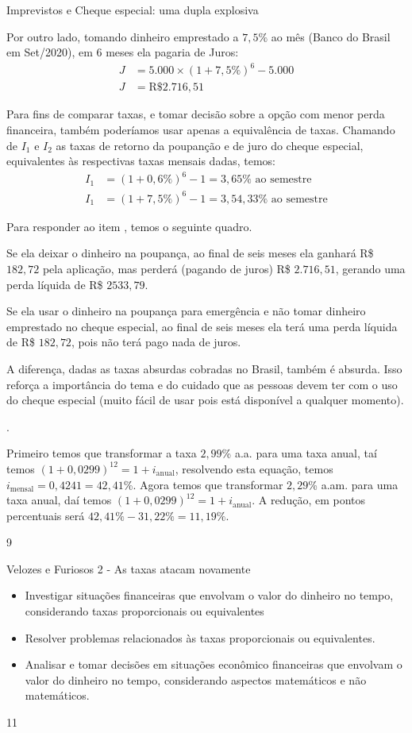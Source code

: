 \begin{answer}{Imprevistos e Cheque especial: uma dupla explosiva}
{\begin{enumerate}
Por outro lado, tomando dinheiro emprestado a $7{,}5\%$ ao mês (Banco do Brasil em Set/2020), em 6 meses ela pagaria de Juros:
\begin{align*}
J&=5.000\times(1+7{,}5\%)^6-5.000\\
J&=\text{R\$ }2.716{,}51
\end{align*}

Para fins de comparar taxas, e tomar decisão sobre a opção com menor perda financeira, também poderíamos usar apenas a equivalência de taxas. Chamando de $I_1$ e $I_2$ as taxas de retorno da poupanção e de juro do cheque especial, equivalentes às respectivas taxas mensais dadas, temos:
\begin{align*}
I_1&=(1+0{,}6\%)^6-1=3{,}65\%\text{ ao semestre}\\
I_1&=(1+7{,}5\%)^6-1=3{,}54{,}33\%\text{ ao semestre}
\end{align*}

Para responder ao item , temos o seguinte quadro.

Se ela deixar o dinheiro na poupança, ao final de seis meses ela ganhará R\$ $182{,}72$ pela aplicação, mas perderá (pagando de juros) R\$ $2.716{,}51$, gerando uma perda líquida de R\$ $2533{,}79$.

Se ela usar o dinheiro na poupança para emergência e não tomar dinheiro emprestado no cheque especial, ao final de seis meses ela terá uma perda líquida de R\$ $182{,}72$, pois não terá pago nada de juros.

A diferença, dadas as taxas absurdas cobradas no Brasil, também é absurda. Isso reforça a importância do tema e do cuidado que as pessoas devem ter com o uso do cheque especial (muito fácil de usar pois está disponível a qualquer momento).
\end{enumerate}.


Primeiro temos que transformar a taxa $2{,}99$\% a.a. para uma taxa anual, taí temos $(1+0{,}0299)^{12}=1+i_{\text{anual}}$, resolvendo esta equação, temos $i_{\text{mensal}}=0{,}4241=42{,}41$\%. Agora temos que transformar $2{,}29$\% a.am. para uma taxa anual, daí temos $(1+0{,}0299)^{12}=1+i_{\text{anual}}$. A redução, em pontos percentuais será $42{,}41\%-31{,}22\%=11{,}19\%$. 

}{9}
\end{answer}
\begin{objectives}{Velozes e Furiosos 2 - As taxas atacam novamente}
{
\begin{itemize}
\item Investigar situações financeiras que envolvam o valor do dinheiro no tempo, considerando taxas proporcionais ou equivalentes
\item Resolver problemas relacionados às taxas proporcionais ou equivalentes.
\item Analisar e tomar decisões em situações econômico financeiras que envolvam o valor do dinheiro no tempo, considerando aspectos matemáticos e não matemáticos.
\end{itemize}
}{1}{1}
\end{objectives}
